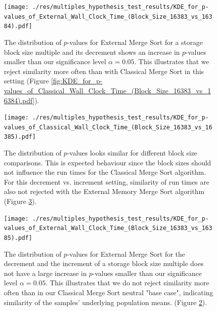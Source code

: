 \documentclass[twocolumn]{article}
\begin{document}
\begin{figure}[htb]
	\begin{minipage}{0.475 \textwidth}
	\centering
	\texttt{[image: ./res/multiples\_hypothesis\_test\_results/KDE\_for\_p-values\_of\_External\_Wall\_Clock\_Time\_(Block\_Size\_16383\_vs\_16384).pdf]}
	\caption{The distribution of \( p \)-values for External Merge Sort for a storage block size multiple and its decrement shows an increase in \( p \)-values smaller than 
	our significance level \( \alpha = 0.05 \). This illustrates that we reject similarity more often than with Classical Merge Sort in this setting
	(Figure \ref{fig:KDE_for_p-values_of_Classical_Wall_Clock_Time_(Block_Size_16383_vs_16384).pdf}).}
	\label{fig:KDE_for_p-values_of_External_Wall_Clock_Time_(Block_Size_16383_vs_16384).pdf}
	\end{minipage}
\end{figure}

\begin{figure}[htb]
	\begin{minipage}{0.475 \textwidth}
	\centering
	\texttt{[image: ./res/multiples\_hypothesis\_test\_results/KDE\_for\_p-values\_of\_Classical\_Wall\_Clock\_Time\_(Block\_Size\_16383\_vs\_16385).pdf]}
	\caption{The distribution of \( p \)-values looks similar for different block size comparisons. This is expected behaviour since the block sizes should not influence the run times for the Classical Merge
	Sort algorithm. For this decrement vs. increment setting, similarity of run times are also not rejected with the External Memory Merge Sort algorithm 
	(Figure \ref{fig:KDE_for_p-values_of_External_Wall_Clock_Time_(Block_Size_16383_vs_16385).pdf}).}
	\label{fig:KDE_for_p-values_of_Classical_Wall_Clock_Time_(Block_Size_16383_vs_16385).pdf}
\end{minipage}
\end{figure}

\begin{figure}[htb]
	\begin{minipage}{0.475 \textwidth}
	\centering
	\texttt{[image: ./res/multiples\_hypothesis\_test\_results/KDE\_for\_p-values\_of\_External\_Wall\_Clock\_Time\_(Block\_Size\_16383\_vs\_16385).pdf]}
	\caption{The distribution of \( p \)-values for External Merge Sort for the decrement and the increment of a storage block size multiple does not have a large increase in \( p \)-values 
	smaller than our significance level \( \alpha = 0.05 \). This illustrates that we do not reject similarity more often than in our Classical Merge Sort neutral "base case", indicating similarity of the samples' underlying population means.
	(Figure \ref{fig:KDE_for_p-values_of_Classical_Wall_Clock_Time_(Block_Size_16383_vs_16385).pdf}).}
	\label{fig:KDE_for_p-values_of_External_Wall_Clock_Time_(Block_Size_16383_vs_16385).pdf}
	\end{minipage}
\end{figure}
\end{document}

